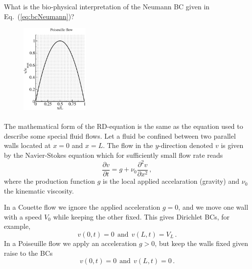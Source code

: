 \begin{question}
	What is the bio-physical interpretation of the Neumann BC given in
	Eq.~(\ref{eq:bcNeumann})? 
\end{question}

\begin{example}\label{example:flow}

	\begin{figure}
		\centering
		\includegraphics[width=0.3\textwidth]{figs/poiseuille.eps}
		\caption*{}
	\end{figure}
	\paragraph{}
	\vspace*{-\parskip}

	The mathematical form of the RD-equation is the same as the equation used to describe some 
	special fluid flows. Let a fluid be confined
	between two parallel walls located at $x=0$ and $x=L$. The flow in the
	$y$-direction denoted $v$ is given by the Navier-Stokes equation which
	for sufficiently small flow rate reads
	\begin{equation}
		\frac{\partial v}{\partial t} = g + \nu_0 \frac{\partial^2 v}{\partial
		x^2} \, ,
	\end{equation}
	where the production function $g$ is the local applied accelaration (gravity) and $\nu_0$ 
	the kinematic viscosity.

	In a Couette flow we ignore the applied acceleration $g=0$, and we move one wall with a
	speed $V_0$ while keeping the other fixed. This gives Dirichlet BCs, for example,  
	\begin{equation}
		v(0,t)=0 \ \ \text{and} \ \ v(L,t)=V_L \, .
	\end{equation}
	In a Poiseuille flow we apply an acceleration $g > 0$, but keep the walls
	fixed given raise to the BCs
	\begin{equation}
		v(0,t)=0 \ \ \text{and} \ \ v(L,t)=0 \, .
	\end{equation}
\end{example}

